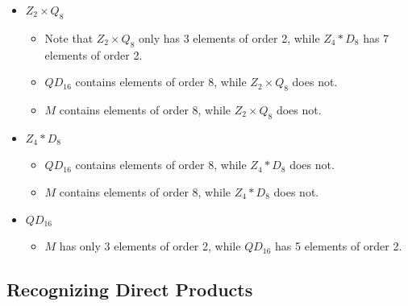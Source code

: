 \begin{sol}
\begin{itemize}
\begin{itemize}
            \item Note that $\bar{(x^k, q)} \in Z_4 * Q_8 \cong Z_4 * D_8$ has order 2 when $(x^k, q)^2 = (1, 1)$ or $(x^2, -1)$. Since we already identify $x^2$ with $-1$ in the quotient, then the case of $q^2 = 1$ and $2i \equiv 0 \bmod 4$ gives the same element, hence only 1 element of order 2. The other case of $q^2 = -1$ and $2i \equiv 2 \bmod 4$, or $i$ odd and $q = Q_8 \setminus Z(Q_8)$ gives 6 elements of order 2, for a total of 7 elements of order 2 in $Z_4 * D_8$, while $Z_2 \times D_8$ has 11 elements of order 2.
            \item $QD_{16}$ contains elements of order 8, while $Z_2 \times D_8$ does not.
            \item $M$ contains elements of order 8, while $Z_2 \times D_8$ does not.
        \end{itemize}
        \item $Z_2 \times Q_8$
        \begin{itemize}
            \item Note that $Z_2 \times Q_8$ only has 3 elements of order 2, while $Z_4 * D_8$ has 7 elements of order 2.
            \item $QD_{16}$ contains elements of order 8, while $Z_2 \times Q_8$ does not.
            \item $M$ contains elements of order 8, while $Z_2 \times Q_8$ does not.
        \end{itemize}
        \item $Z_4 * D_8$
        \begin{itemize}
            \item $QD_{16}$ contains elements of order 8, while $Z_4 * D_8$ does not.
            \item $M$ contains elements of order 8, while $Z_4 * D_8$ does not.
        \end{itemize}
        \item $QD_{16}$
        \begin{itemize}
            \item $M$ has only 3 elements of order 2, while $QD_{16}$ has 5 elements of order 2. \qh
        \end{itemize}
    \end{itemize}
\end{sol}

\newpage

\subsection{Recognizing Direct Products}

